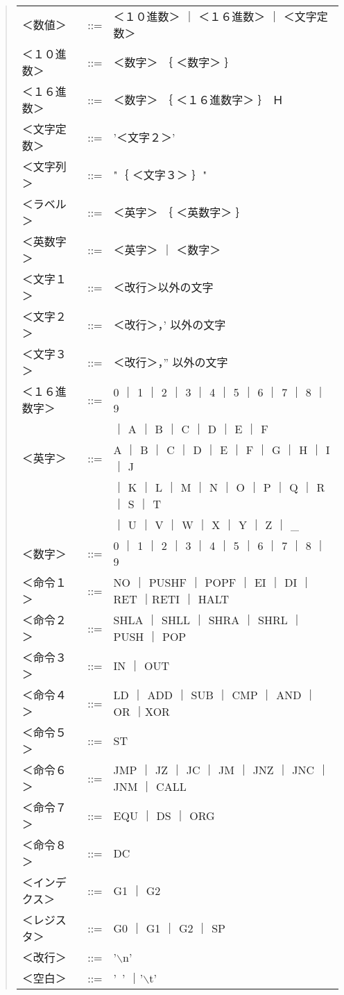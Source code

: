 \begin{quote}
\begin{tabular}{lll}
＜数値＞      & ::= &＜１０進数＞ ｜ ＜１６進数＞ ｜ ＜文字定数＞ \\
＜１０進数＞  & ::= &＜数字＞ ｛ ＜数字＞ ｝ \\
＜１６進数＞  & ::= &＜数字＞ ｛ ＜１６進数字＞ ｝ Ｈ \\
＜文字定数＞  & ::= &'＜文字２＞' \\
＜文字列＞    & ::= &"｛ ＜文字３＞ ｝" \\
＜ラベル＞      & ::= &＜英字＞ ｛ ＜英数字＞ ｝ \\
＜英数字＞    & ::= &＜英字＞ ｜ ＜数字＞ \\
＜文字１＞    & ::= &＜改行＞以外の文字 \\
＜文字２＞    & ::= &＜改行＞，' 以外の文字 \\
＜文字３＞    & ::= &＜改行＞，” 以外の文字 \\
＜１６進数字＞& ::= &0 ｜ 1 ｜ 2 ｜ 3 ｜ 4 ｜ 5 ｜ 6 ｜ 7 ｜ 8 ｜ 9 \\
              &     & ｜ A ｜ B ｜ C ｜ D ｜ E ｜ F \\
＜英字＞      & ::= &A ｜ B ｜ C ｜ D ｜ E ｜ F ｜ G ｜ H ｜ I ｜ J \\
              &     & ｜ K ｜ L ｜ M ｜ N ｜ O ｜ P ｜ Q ｜ R ｜ S ｜ T \\
              &     & ｜ U ｜ V ｜ W ｜ X ｜ Y ｜ Z ｜ \_ \\
＜数字＞      & ::= &0 ｜ 1 ｜ 2 ｜ 3 ｜ 4 ｜ 5 ｜ 6 ｜ 7 ｜ 8 ｜ 9 \\
＜命令１＞    & ::= &NO ｜ PUSHF ｜ POPF ｜ EI ｜ DI ｜ RET ｜RETI ｜ HALT \\
＜命令２＞    & ::= &SHLA ｜ SHLL ｜ SHRA ｜ SHRL ｜ PUSH ｜ POP \\
＜命令３＞    & ::= &IN ｜ OUT \\
＜命令４＞    & ::= &LD ｜ ADD ｜ SUB ｜ CMP ｜ AND ｜ OR ｜XOR \\
＜命令５＞    & ::= &ST \\
＜命令６＞    & ::= &JMP ｜ JZ ｜ JC ｜ JM ｜ JNZ ｜ JNC ｜ JNM ｜ CALL \\
＜命令７＞    & ::= &EQU ｜ DS ｜ ORG \\
＜命令８＞    & ::= &DC \\
＜インデクス＞& ::= &G1 ｜ G2 \\
＜レジスタ＞  & ::= &G0 ｜ G1 ｜ G2 ｜ SP \\
＜改行＞      & ::= &'$\backslash$n' \\
＜空白＞      & ::= &'~' ｜'$\backslash$t' \\
\end{tabular}
\end{quote}



